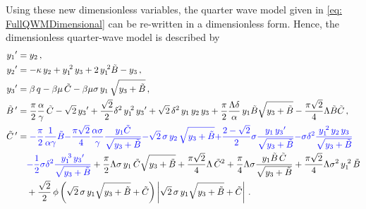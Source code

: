 Using these new dimensionless variables, the quarter wave model given in \cref{eq: FullQWMDimensional} can be re-written in a dimensionless form. Hence, the dimensionless quarter-wave model is described by
~
\begin{equation} \label{eq: FullQWMDimensionless}
\begin{split}
    \dash{y_1} &= y_2 \, , \\
    \dash{y_2} &= - \kappa \, y_2 + y_1\power{2} \, y_3 + 2 \, y_1\power{2} \tilde{B} - y_3 \, , \\
    \dash{y_3} &= \beta \, q - \beta \mu \, \tilde{C} - \beta \mu \sigma \, y_1 \, \sqrt{y_3 + \tilde{B}} \, , \\
    \dash{\tilde{B}\,} &= \frac{\pi}{2} \frac{\alpha}{\gamma} \, \tilde{C} - \sqrt{2} \, \dash{y_3} + \frac{\sqrt{2}}{2} \delta^2 \, y_1\power{2} \, \dash{y_3} + \sqrt{2} \, \delta^2 \, y_1 \, y_2 \, y_3 + \frac{\pi}{2} \frac{\Lambda \delta}{\alpha} \, y_1 \tilde{B} \sqrt{y_3 + \tilde{B}} - \frac{\pi \sqrt{2}}{4} \Lambda \tilde{B} \tilde{C} \, , \\
    \dash{\tilde{C}\,} &=
    \textcolor{Blue}{- \frac{\pi}{2} \frac{1}{\alpha \gamma} \tilde{B}}
    \textcolor{Blue}{- \frac{\pi \sqrt{2}}{4} \frac{\alpha \sigma}{\gamma} \frac{y_1 \tilde{C}}{\sqrt{y_3 + \tilde{B}}} }
    \textcolor{Blue}{- \sqrt{2} \, \sigma \, y_2 \, \sqrt{y_3 + \tilde{B}} }
    \textcolor{Blue}{+ \frac{2-\sqrt{2}}{2} \sigma \frac{y_1 \, \dash{y_3}}{\sqrt{y_3 + \tilde{B}}} }
    \textcolor{Blue}{- \sigma \delta^2 \frac{y_1\power{2} \, y_2 \, y_3}{\sqrt{y_3 + \tilde{B}}} }
    \\ & \quad %
    \textcolor{Blue}{- \frac{1}{2} \sigma \delta^2 \frac{y_1\power{3} \, \dash{y_3}}{\sqrt{y_3 + \tilde{B}}} }
    + \frac{\pi}{2} \Lambda \sigma \, y_1 \, \tilde{C} \sqrt{y_3 + \tilde{B}}
    + \frac{\pi \sqrt{2}}{4} \Lambda \, \tilde{C}^2
    + \frac{\pi}{4} \Lambda \sigma \frac{y_1 \tilde{B} \, \tilde{C}}{\sqrt{y_3 + \tilde{B}}}
    + \frac{\pi \sqrt{2}}{4} \Lambda \sigma^2 \, y_1\power{2} \, \tilde{B}
    \\ & \quad %
    + \frac{\sqrt{2}}{2} \, \phi \left( \sqrt{2} \, \sigma \, y_1 \sqrt{y_3 + \tilde{B}} + \tilde{C} \right) \left| \sqrt{2} \, \sigma \, y_1 \sqrt{y_3 + \tilde{B}} + \tilde{C} \right| \, .
\end{split}
\end{equation}

